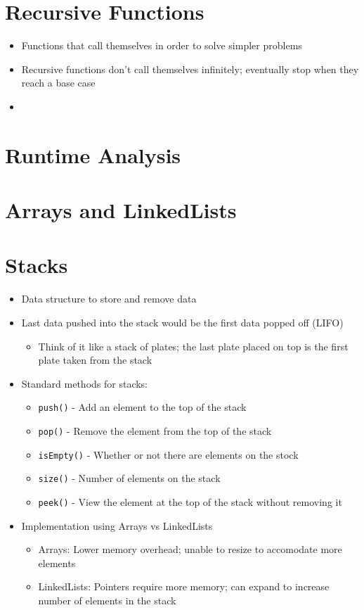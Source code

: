 \documentclass{article}
\begin{document}
\section{Recursive Functions}
\begin{itemize}
    \item Functions that call themselves in order to solve simpler problems
    \item Recursive functions don't call themselves infinitely; eventually stop when they reach a base case
    \item 
\end{itemize}

\section{Runtime Analysis}

\section{Arrays and LinkedLists}

\section{Stacks}
\begin{itemize}
    \item Data structure to store and remove data
    \item Last data pushed into the stack would be the first data popped off (LIFO)
    \begin{itemize}
        \item Think of it like a stack of plates; the last plate placed on top is the first plate taken from the stack
    \end{itemize}
    \item Standard methods for stacks:
    \begin{itemize}
        \item \verb|push()| - Add an element to the top of the stack
        \item \verb|pop()| - Remove the element from the top of the stack
        \item \verb|isEmpty()| - Whether or not there are elements on the stock
        \item \verb|size()| - Number of elements on the stack
        \item \verb|peek()| - View the element at the top of the stack without removing it
    \end{itemize}
    \item Implementation using Arrays vs LinkedLists
    \begin{itemize}
        \item Arrays: Lower memory overhead; unable to resize to accomodate more elements
        \item LinkedLists: Pointers require more memory; can expand to increase number of elements in the stack
    \end{itemize}
\end{itemize}
\end{document}
